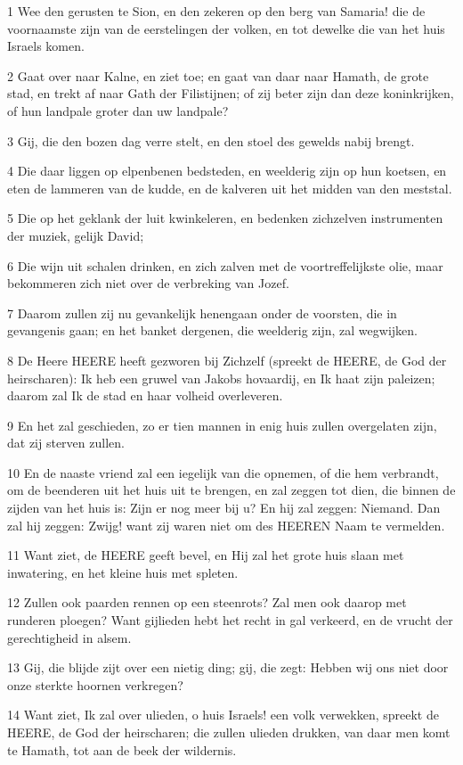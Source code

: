 \par 1 Wee den gerusten te Sion, en den zekeren op den berg van Samaria! die de voornaamste zijn van de eerstelingen der volken, en tot dewelke die van het huis Israels komen.
\par 2 Gaat over naar Kalne, en ziet toe; en gaat van daar naar Hamath, de grote stad, en trekt af naar Gath der Filistijnen; of zij beter zijn dan deze koninkrijken, of hun landpale groter dan uw landpale?
\par 3 Gij, die den bozen dag verre stelt, en den stoel des gewelds nabij brengt.
\par 4 Die daar liggen op elpenbenen bedsteden, en weelderig zijn op hun koetsen, en eten de lammeren van de kudde, en de kalveren uit het midden van den meststal.
\par 5 Die op het geklank der luit kwinkeleren, en bedenken zichzelven instrumenten der muziek, gelijk David;
\par 6 Die wijn uit schalen drinken, en zich zalven met de voortreffelijkste olie, maar bekommeren zich niet over de verbreking van Jozef.
\par 7 Daarom zullen zij nu gevankelijk henengaan onder de voorsten, die in gevangenis gaan; en het banket dergenen, die weelderig zijn, zal wegwijken.
\par 8 De Heere HEERE heeft gezworen bij Zichzelf (spreekt de HEERE, de God der heirscharen): Ik heb een gruwel van Jakobs hovaardij, en Ik haat zijn paleizen; daarom zal Ik de stad en haar volheid overleveren.
\par 9 En het zal geschieden, zo er tien mannen in enig huis zullen overgelaten zijn, dat zij sterven zullen.
\par 10 En de naaste vriend zal een iegelijk van die opnemen, of die hem verbrandt, om de beenderen uit het huis uit te brengen, en zal zeggen tot dien, die binnen de zijden van het huis is: Zijn er nog meer bij u? En hij zal zeggen: Niemand. Dan zal hij zeggen: Zwijg! want zij waren niet om des HEEREN Naam te vermelden.
\par 11 Want ziet, de HEERE geeft bevel, en Hij zal het grote huis slaan met inwatering, en het kleine huis met spleten.
\par 12 Zullen ook paarden rennen op een steenrots? Zal men ook daarop met runderen ploegen? Want gijlieden hebt het recht in gal verkeerd, en de vrucht der gerechtigheid in alsem.
\par 13 Gij, die blijde zijt over een nietig ding; gij, die zegt: Hebben wij ons niet door onze sterkte hoornen verkregen?
\par 14 Want ziet, Ik zal over ulieden, o huis Israels! een volk verwekken, spreekt de HEERE, de God der heirscharen; die zullen ulieden drukken, van daar men komt te Hamath, tot aan de beek der wildernis.

